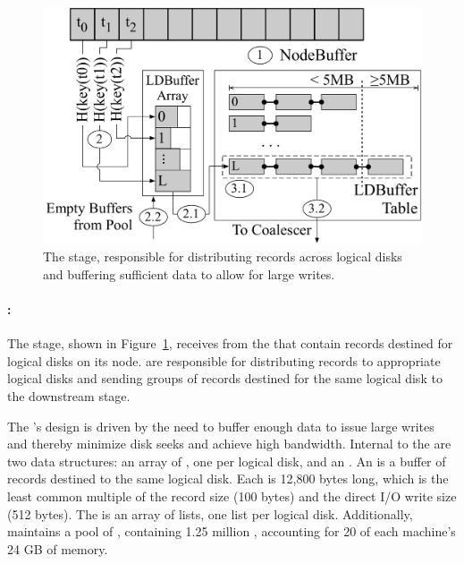 \begin{figure}
  \centering
  \includegraphics[width=\columnwidth]{tritonsort/figs/ldts_stage.pdf}
  \caption{The \ldts stage, responsible for distributing records
  across logical disks and buffering sufficient data to allow for large writes.}
  \label{fig:ldts}
\end{figure}

\paragraph{\ldts:} The \ldts stage, shown in Figure~\ref{fig:ldts}, receives
\nodebuffers from the \receiver that contain records destined for logical disks
on its node.  \ldtss are responsible for distributing records to appropriate
logical disks and sending groups of records destined for the same logical disk to
the downstream \writer stage.

The \ldts's design is driven by the need to buffer enough data to issue large
writes and thereby minimize disk seeks and achieve high bandwidth. Internal to
the \ldts are two data structures: an array of \ldbuffers, one per logical
disk, and an \ldtable.  An \ldbuffer is a buffer of records destined to the same
logical disk.  Each \ldbuffer is 12,800 bytes long, which is the least common
multiple of the record size (100 bytes) and the direct I/O write size (512
bytes).  The \ldtable is an array of \ldbuffer lists, one list per logical disk.
Additionally, \ldts maintains a pool of \ldbuffers, containing 1.25 million
\ldbuffers, accounting for 20 of each machine's 24 GB of memory.

